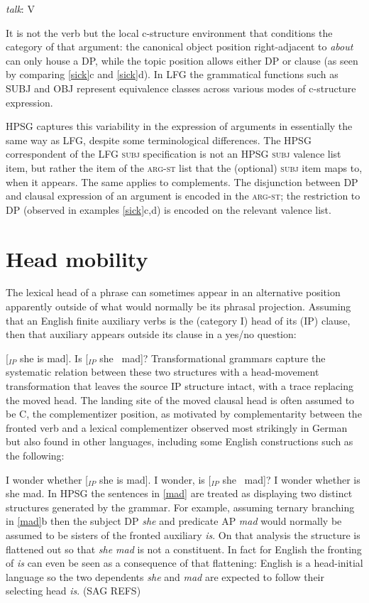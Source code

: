 \eal \label{talk-about}
{{\it talk}\/: V}\qquad{}    
\zl

\noindent
It is not the verb but the local c-structure environment that conditions the category of that argument: the canonical object position right-adjacent to \textit{about} can only house a DP, while the topic position allows either DP or clause (as seen by comparing \ref{sick}c and \ref{sick}d).  In LFG the grammatical functions such as SUBJ and OBJ represent equivalence classes across various modes of c-structure expression.  

HPSG captures this variability in the expression of arguments in essentially the same way as LFG, despite some terminological differences.  The HPSG correspondent of the LFG \textsc{subj} specification is not an HPSG \textsc{subj} valence list item, but rather the item of the \textsc{arg-st} list that the (optional) \textsc{subj}  item maps to, when it appears.  The same applies to complements.  The disjunction between DP and clausal expression of an argument is encoded in the \textsc{arg-st;} the restriction to DP (observed in examples \ref{sick}c,d) is encoded on the relevant valence list.  


\section{Head mobility} 
\label{mobile-sec}
The lexical head of a phrase can sometimes appear in an alternative position apparently outside of what would normally be its phrasal projection.  Assuming that an English finite auxiliary verbs is the (category I) head of its (IP) clause, then that auxiliary appears outside its clause in a yes/no question:

\eal 
\label{mad}
\ex {} [$_{IP}$ she is mad].
\ex  Is   [$_{IP}$ she \gap\ mad]?
\zl
Transformational grammars capture the systematic relation between these two structures with a head-movement transformation that leaves the source IP structure intact, with a trace replacing the moved head.  The landing site of the moved clausal head is often assumed to be C, the complementizer position, as motivated by complementarity between the fronted verb and a lexical complementizer observed most strikingly in German but also found in other languages, including some English constructions such as the following:  

\eal 
\label{mad2}
\ex  I wonder whether [$_{IP}$ she is mad]. 
\ex  I wonder,  is  [$_{IP}$ she \gap\ mad]?
\ex  *I wonder whether is she mad.
\zl
In HPSG the sentences in \ref{mad} are treated as displaying two distinct structures generated by the grammar.  For example, assuming ternary branching in \ref{mad}b then the subject DP \textit{she} and predicate AP \textit{mad} would normally be assumed to be sisters of the fronted auxiliary \textit{is}.  On that analysis the structure is flattened out so that \textit{she mad} is not a constituent.  In fact for English the fronting of \textit{is} can even be seen as a consequence of that flattening:  English is a head-initial language so the two dependents \textit{she} and \textit{mad} are expected to follow their selecting head \textit{is}.  (SAG REFS)  

